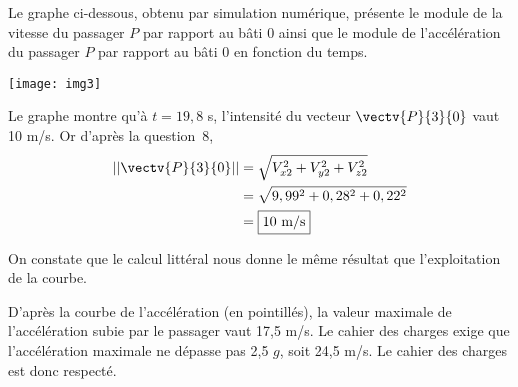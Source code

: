 \vspace{.3cm}

Le graphe ci-dessous, obtenu par simulation numérique, présente le module de la vitesse du passager $P$ par rapport au bâti 0 ainsi que le module de l'accélération du passager $P$ par rapport au bâti 0 en fonction du temps. 
\begin{center}
\texttt{[image: img3]}
\end{center}

\ifprof
\begin{corrige}

Le graphe montre qu'à $t=19,8$ s, l'intensité du vecteur $\vectv{P}{3}{0}$ vaut 10 m/s. Or  d'après la question~8, 
\begin{align*}
\left|\left|\vectv{P}{3}{0}\right|\right|&=\sqrt{V_{x2}^2+V_{y2}^2+V_{z2}^2}\\
	&=\sqrt{9,99^2+0,28^2+0,22^2}\\
	&=\boxed{10\text{ m/s} }
\end{align*}

On constate que le calcul littéral nous donne le même résultat que l'exploitation de la courbe.

\end{corrige}\else\fi

\ifprof
\begin{corrige}
D'après la courbe de l'accélération (en pointillés), la valeur maximale de l'accélération subie par le passager vaut 17,5 m/s. Le cahier des charges exige que l'accélération maximale ne dépasse pas 2,5 $g$, soit 24,5 m/s. Le cahier des charges est donc respecté.

\end{corrige}\else\fi

